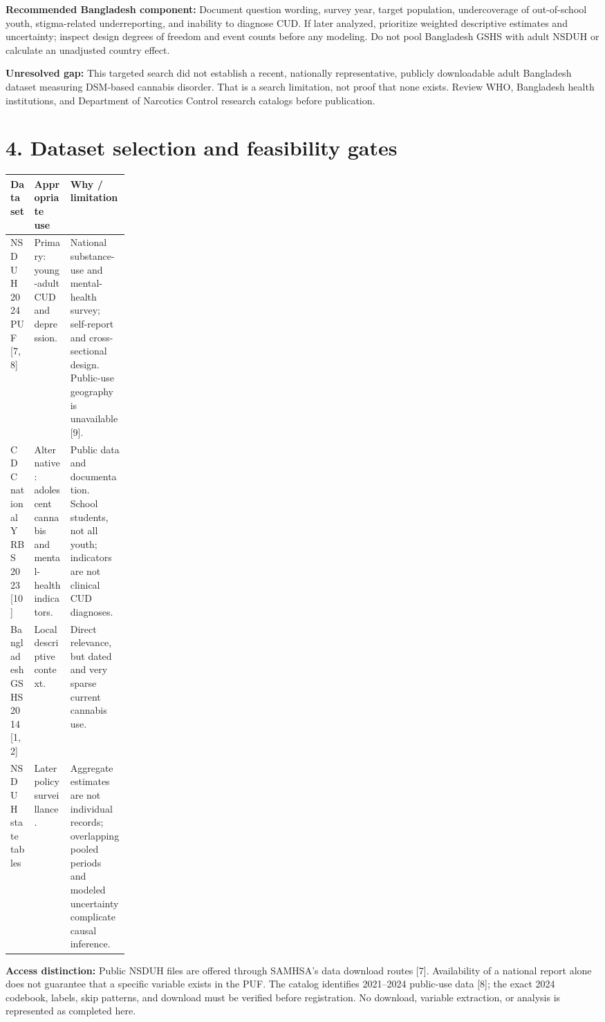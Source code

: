 \documentclass[10pt]{article}
\newcommand{\head}[1]{\section*{\color{navy}#1}}
\begin{document}
\textbf{Recommended Bangladesh component:} Document question wording, survey year, target population, undercoverage of out-of-school youth, stigma-related underreporting, and inability to diagnose CUD. If later analyzed, prioritize weighted descriptive estimates and uncertainty; inspect design degrees of freedom and event counts before any modeling. Do not pool Bangladesh GSHS with adult NSDUH or calculate an unadjusted country effect.

\textbf{Unresolved gap:} This targeted search did not establish a recent, nationally representative, publicly downloadable adult Bangladesh dataset measuring DSM-based cannabis disorder. That is a search limitation, not proof that none exists. Review WHO, Bangladesh health institutions, and Department of Narcotics Control research catalogs before publication.
\newpage
\head{4. Dataset selection and feasibility gates}
\begin{tabularx}{\linewidth}{@{}p{0.20\linewidth}XX@{}}\toprule
Dataset & Appropriate use & Why / limitation\\\midrule
NSDUH 2024 PUF [7,8] & Primary: young-adult CUD and depression. & National substance-use and mental-health survey; self-report and cross-sectional design. Public-use geography is unavailable [9].\\
CDC national YRBS 2023 [10] & Alternative: adolescent cannabis and mental-health indicators. & Public data and documentation. School students, not all youth; indicators are not clinical CUD diagnoses.\\
Bangladesh GSHS 2014 [1,2] & Local descriptive context. & Direct relevance, but dated and very sparse current cannabis use.\\
NSDUH state tables & Later policy surveillance. & Aggregate estimates are not individual records; overlapping pooled periods and modeled uncertainty complicate causal inference.\\\bottomrule
\end{tabularx}

\textbf{Access distinction:} Public NSDUH files are offered through SAMHSA's data download routes [7]. Availability of a national report alone does not guarantee that a specific variable exists in the PUF. The catalog identifies 2021--2024 public-use data [8]; the exact 2024 codebook, labels, skip patterns, and download must be verified before registration. No download, variable extraction, or analysis is represented as completed here.
\end{document}
